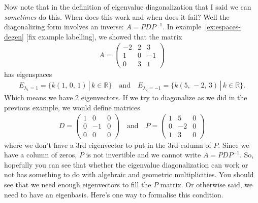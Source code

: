 \noindent Now note that in the definition of eigenvalue diagonalization that I said we can \textit{sometimes} do this. When does this work and when does it fail? Well the diagonalizing form involves an inverse: $A = P D P^{-1}$. In example~\ref{ex:espaces-degen} [fix example labelling], we showed that the matrix
\begin{align*}
A
=
\begin{pmatrix}
 -2 &  2 &  3 \\
  1 &  0 & -1 \\
  0 &  3 &  1
\end{pmatrix}
\end{align*}
has eigenspaces
\begin{align*}
E_{\lambda_1=1} = \{ k(1,\,0,\,1) \, | \, k \in \mathbb{R} \} \quad \text{and} \quad E_{\lambda_2=-1} = \{ k(5,\,-2,\,3) \, | \, k \in \mathbb{R} \}.
\end{align*}
Which means we have 2 eigenvectors. If we try to diagonalize as we did in the previous example, we would define matrices
\begin{align*}
D=
\begin{pmatrix}
  1 &  0 &  0 \\
  0 & -1 &  0 \\
  0 &  0 &  0
\end{pmatrix}
\quad \text{and} \quad
P=
\begin{pmatrix}
  1 &  5 &  0 \\
  0 & -2 &  0 \\
  1 &  3 &  0
\end{pmatrix}
\end{align*}
where we don't have a 3rd eigenvector to put in the 3rd column of $P$. Since we have a column of zeros, $P$ is not invertible and we cannot write $A = P D P^{-1}$. So, hopefully you can see that whether the eigenvalue diagonalization can work or not has something to do with algebraic and geometric multiplicities. You should see that we need enough eigenvectors to fill the $P$ matrix. Or otherwise said, we need to have an eigenbasis. Here's one way to formalise this condition.


